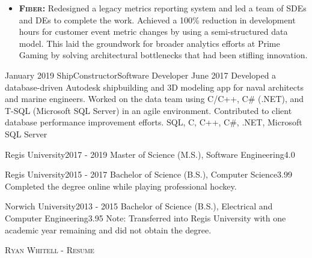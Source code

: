 \documentclass{cv}
\begin{document}
\begin{experiences_env}
{\begin{itemize}
									\item \textbf{\textsc{Fiber:}} Redesigned a legacy metrics reporting system and led a team of SDEs and DEs to complete the work. Achieved a 100\% reduction in development hours for customer event metric changes by using a semi-structured data model. This laid the groundwork for broader analytics efforts at Prime Gaming by solving architectural bottlenecks that had been stifling innovation.
								\end{itemize}
							}
		\emptySeparator
		\experienceWithoutProjects
			{January 2019}  {ShipConstructor}{Software Developer}
			{June 2017}     {
								Developed a database-driven Autodesk shipbuilding and 3D modeling app for naval architects and marine engineers. Worked on the data team using C/C++, C\# (.NET), and T-SQL (Microsoft SQL Server) in an agile environment. Contributed to client database performance improvement efforts.
							}
							{SQL, C, C++, C\#, .NET, Microsoft SQL Server}
		\emptySeparator
	\end{experiences_env}

	\begin{education_env}
		\education
		{Regis University}{2017 - 2019}
		{Master of Science (M.S.), Software Engineering}{4.0}
		{}
					
		\education
		{Regis University}{2015 - 2017}
		{Bachelor of Science (B.S.), Computer Science}{3.99}
		{Completed the degree online while playing professional hockey.}

		\education
		{Norwich University}{2013 - 2015}
		{Bachelor of Science (B.S.), Electrical and Computer Engineering}{3.95}
		{Note: Transferred into Regis University with one academic year remaining and did not obtain the degree.}
	\end{education_env}

	\makecvfooter
	{}
	{\textsc{Ryan Whitell - Resume}}
	{}
\end{document}
